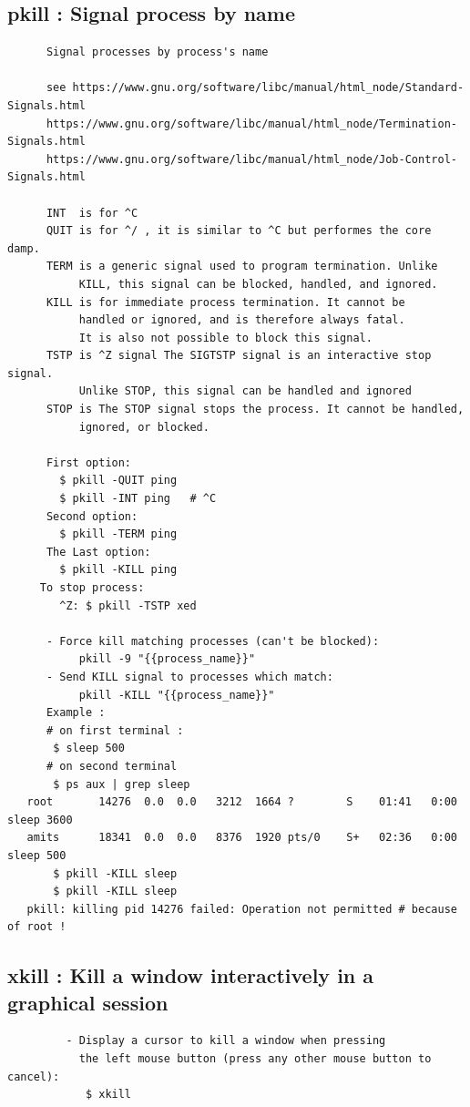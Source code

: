 \documentclass[a4paper,12pt]{article}
\begin{document}
\subsection{pkill     : Signal process by name }
\begin{verbatim}
      Signal processes by process's name
       
      see https://www.gnu.org/software/libc/manual/html_node/Standard-Signals.html
      https://www.gnu.org/software/libc/manual/html_node/Termination-Signals.html
      https://www.gnu.org/software/libc/manual/html_node/Job-Control-Signals.html
     
      INT  is for ^C
      QUIT is for ^/ , it is similar to ^C but performes the core damp.
      TERM is a generic signal used to program termination. Unlike 
           KILL, this signal can be blocked, handled, and ignored.     
      KILL is for immediate process termination. It cannot be 
           handled or ignored, and is therefore always fatal.
           It is also not possible to block this signal.
      TSTP is ^Z signal The SIGTSTP signal is an interactive stop signal.
           Unlike STOP, this signal can be handled and ignored
      STOP is The STOP signal stops the process. It cannot be handled, 
           ignored, or blocked. 
       
      First option:
        $ pkill -QUIT ping
        $ pkill -INT ping   # ^C
      Second option:
        $ pkill -TERM ping
      The Last option:
        $ pkill -KILL ping
     To stop process:
        ^Z: $ pkill -TSTP xed 

      - Force kill matching processes (can't be blocked):
           pkill -9 "{{process_name}}"
      - Send KILL signal to processes which match:
           pkill -KILL "{{process_name}}"
      Example :
      # on first terminal : 
       $ sleep 500
      # on second terminal
       $ ps aux | grep sleep
   root       14276  0.0  0.0   3212  1664 ?        S    01:41   0:00 sleep 3600
   amits      18341  0.0  0.0   8376  1920 pts/0    S+   02:36   0:00 sleep 500      
       $ pkill -KILL sleep     
       $ pkill -KILL sleep
   pkill: killing pid 14276 failed: Operation not permitted # because of root !

\end{verbatim}

\subsection{xkill     : Kill a window interactively in a graphical session }
\begin{verbatim}
         - Display a cursor to kill a window when pressing 
           the left mouse button (press any other mouse button to cancel):
            $ xkill

\end{verbatim}
\end{document}
